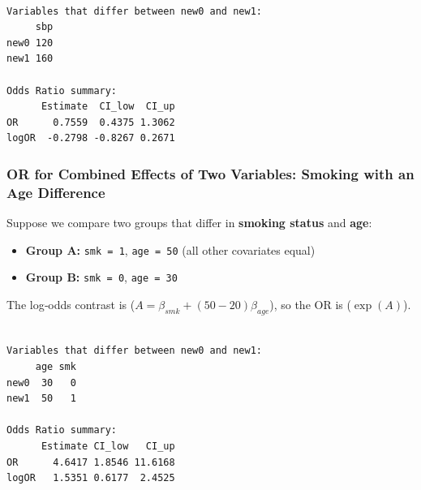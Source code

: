 \documentclass[
  letterpaper,
]{scrbook}
\newenvironment{Shaded}{\begin{snugshade}}{\end{snugshade}}
\newcommand{\AttributeTok}[1]{\textcolor[rgb]{0.40,0.45,0.13}{#1}}
\newcommand{\DecValTok}[1]{\textcolor[rgb]{0.68,0.00,0.00}{#1}}
\newcommand{\FunctionTok}[1]{\textcolor[rgb]{0.28,0.35,0.67}{#1}}
\newcommand{\NormalTok}[1]{\textcolor[rgb]{0.00,0.23,0.31}{#1}}
\newcommand{\OtherTok}[1]{\textcolor[rgb]{0.00,0.23,0.31}{#1}}
\newcommand{\SpecialCharTok}[1]{\textcolor[rgb]{0.37,0.37,0.37}{#1}}
\providecommand{\tightlist}{%
  \setlength{\itemsep}{0pt}\setlength{\parskip}{0pt}}\usepackage{longtable,booktabs,array}
\begin{document}
\begin{verbatim}

Variables that differ between new0 and new1:
     sbp
new0 120
new1 160

Odds Ratio summary:
      Estimate  CI_low  CI_up
OR      0.7559  0.4375 1.3062
logOR  -0.2798 -0.8267 0.2671
\end{verbatim}

\subsubsection{OR for Combined Effects of Two Variables: Smoking with an
Age
Difference}\label{or-for-combined-effects-of-two-variables-smoking-with-an-age-difference}

Suppose we compare two groups that differ in \textbf{smoking status} and
\textbf{age}:

\begin{itemize}
\tightlist
\item
  \textbf{Group A:} \texttt{smk\ =\ 1}, \texttt{age\ =\ 50} (all other
  covariates equal)
\item
  \textbf{Group B:} \texttt{smk\ =\ 0}, \texttt{age\ =\ 30}
\end{itemize}

The log‑odds contrast is (\(A = \beta_{smk} + (50-20)\beta_{age}\)), so
the OR is (\(\exp(A)\)).

\begin{Shaded}
\end{Shaded}

\begin{verbatim}

Variables that differ between new0 and new1:
     age smk
new0  30   0
new1  50   1

Odds Ratio summary:
      Estimate CI_low   CI_up
OR      4.6417 1.8546 11.6168
logOR   1.5351 0.6177  2.4525
\end{verbatim}
\end{document}
